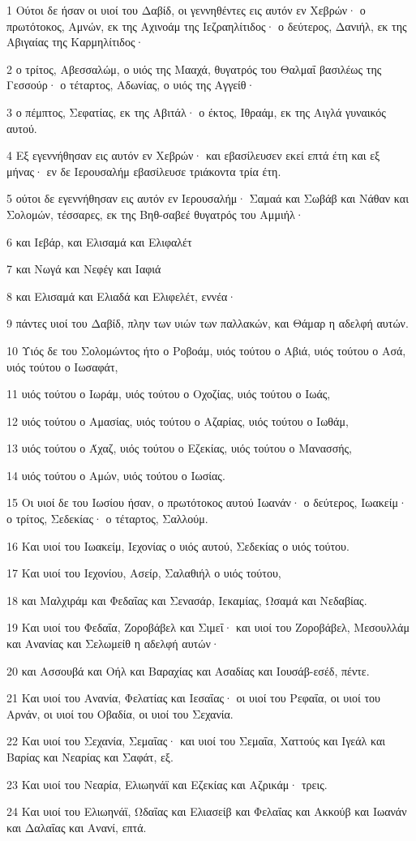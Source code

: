 \par 1 Ούτοι δε ήσαν οι υιοί του Δαβίδ, οι γεννηθέντες εις αυτόν εν Χεβρών· ο πρωτότοκος, Αμνών, εκ της Αχινοάμ της Ιεζραηλίτιδος· ο δεύτερος, Δανιήλ, εκ της Αβιγαίας της Καρμηλίτιδος·
\par 2 ο τρίτος, Αβεσσαλώμ, ο υιός της Μααχά, θυγατρός του Θαλμαΐ βασιλέως της Γεσσούρ· ο τέταρτος, Αδωνίας, ο υιός της Αγγείθ·
\par 3 ο πέμπτος, Σεφατίας, εκ της Αβιτάλ· ο έκτος, Ιθραάμ, εκ της Αιγλά γυναικός αυτού.
\par 4 Εξ εγεννήθησαν εις αυτόν εν Χεβρών· και εβασίλευσεν εκεί επτά έτη και εξ μήνας· εν δε Ιερουσαλήμ εβασίλευσε τριάκοντα τρία έτη.
\par 5 ούτοι δε εγεννήθησαν εις αυτόν εν Ιερουσαλήμ· Σαμαά και Σωβάβ και Νάθαν και Σολομών, τέσσαρες, εκ της Βηθ-σαβεέ θυγατρός του Αμμιήλ·
\par 6 και Ιεβάρ, και Ελισαμά και Ελιφαλέτ
\par 7 και Νωγά και Νεφέγ και Ιαφιά
\par 8 και Ελισαμά και Ελιαδά και Ελιφελέτ, εννέα·
\par 9 πάντες υιοί του Δαβίδ, πλην των υιών των παλλακών, και Θάμαρ η αδελφή αυτών.
\par 10 Υιός δε του Σολομώντος ήτο ο Ροβοάμ, υιός τούτου ο Αβιά, υιός τούτου ο Ασά, υιός τούτου ο Ιωσαφάτ,
\par 11 υιός τούτου ο Ιωράμ, υιός τούτου ο Οχοζίας, υιός τούτου ο Ιωάς,
\par 12 υιός τούτου ο Αμασίας, υιός τούτου ο Αζαρίας, υιός τούτου ο Ιωθάμ,
\par 13 υιός τούτου ο Άχαζ, υιός τούτου ο Εζεκίας, υιός τούτου ο Μανασσής,
\par 14 υιός τούτου ο Αμών, υιός τούτου ο Ιωσίας.
\par 15 Οι υιοί δε του Ιωσίου ήσαν, ο πρωτότοκος αυτού Ιωανάν· ο δεύτερος, Ιωακείμ· ο τρίτος, Σεδεκίας· ο τέταρτος, Σαλλούμ.
\par 16 Και υιοί του Ιωακείμ, Ιεχονίας ο υιός αυτού, Σεδεκίας ο υιός τούτου.
\par 17 Και υιοί του Ιεχονίου, Ασείρ, Σαλαθιήλ ο υιός τούτου,
\par 18 και Μαλχιράμ και Φεδαΐας και Σενασάρ, Ιεκαμίας, Ωσαμά και Νεδαβίας.
\par 19 Και υιοί του Φεδαΐα, Ζοροβάβελ και Σιμεΐ· και υιοί του Ζοροβάβελ, Μεσουλλάμ και Ανανίας και Σελωμείθ η αδελφή αυτών·
\par 20 και Ασσουβά και Οήλ και Βαραχίας και Ασαδίας και Ιουσάβ-εσέδ, πέντε.
\par 21 Και υιοί του Ανανία, Φελατίας και Ιεσαΐας· οι υιοί του Ρεφαΐα, οι υιοί του Αρνάν, οι υιοί του Οβαδία, οι υιοί του Σεχανία.
\par 22 Και υιοί του Σεχανία, Σεμαΐας· και υιοί του Σεμαΐα, Χαττούς και Ιγεάλ και Βαρίας και Νεαρίας και Σαφάτ, εξ.
\par 23 Και υιοί του Νεαρία, Ελιωηνάϊ και Εζεκίας και Αζρικάμ· τρεις.
\par 24 Και υιοί του Ελιωηνάϊ, Ωδαΐας και Ελιασείβ και Φελαΐας και Ακκούβ και Ιωανάν και Δαλαΐας και Ανανί, επτά.

